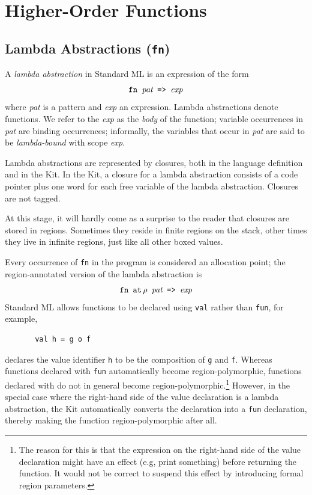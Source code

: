\documentclass[12pt]{book}
\begin{document}
\chapter{Higher-Order Functions}
\label{hof.sec}

\section{Lambda Abstractions ({\tt fn})}
A {\em lambda abstraction} 
%
in Standard ML is an expression of the
form 
$$\hbox{\tt fn {\it pat} => {\it exp}}$$
where {\it pat} is a pattern and {\it exp} an expression.
Lambda abstractions denote functions. We refer to the {\it exp} as the
{\em body} of the function; variable occurrences in {\it pat} are
binding occurrences; informally, the variables that occur
in {\it pat} are said to be {\em lambda-bound} with scope 
{\it exp}. 

Lambda abstractions are represented by closures, both in the language
definition and in the Kit. In the Kit, a closure for a lambda abstraction
consists of a code pointer plus one word for each free variable of the
lambda abstraction. Closures are not tagged. 

At this stage, it will hardly come as a surprise to the reader that closures are stored
in regions.  Sometimes they reside in finite regions on the stack, other times
they live in infinite regions, just like all other boxed values.

Every occurrence of {\tt fn} in the program is considered 
an allocation point; the region-annotated version of the lambda abstraction is
$$\hbox{\tt fn $\mathbin{\hbox{\tt at}}\,\rho$ {\it pat} => {\it exp}}$$
Standard ML allows  functions to be declared using {\tt val} rather than {\tt fun}, for example, 
\begin{verbatim}
       val h = g o f
\end{verbatim}
declares the value identifier {\tt h} to be the composition of {\tt g}
and {\tt f}.  Whereas functions declared with 
%
{\tt fun} automatically become region-polymorphic, functions
declared with  do not in general become
%
region-polymorphic.\footnote{The reason for this is that the
  expression on the right-hand side of the value declaration might
  have an effect (e.g, print something) before returning the function.
  It would not be correct to suspend this effect by introducing formal
  region parameters.} However, in the special case where the
right-hand side of the value declaration is a
%
lambda abstraction, the Kit automatically converts the declaration
into a {\tt fun} declaration, thereby making the function
region-polymorphic after all.
\end{document}
